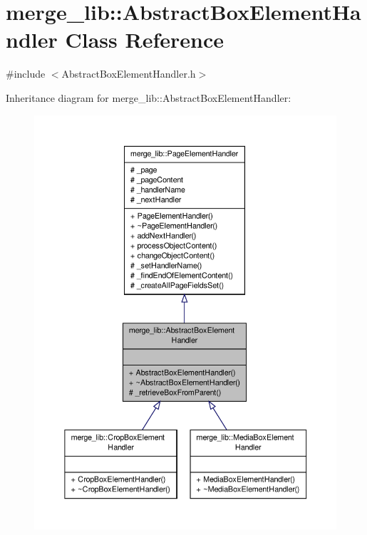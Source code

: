 \hypertarget{classmerge__lib_1_1_abstract_box_element_handler}{\section{merge\-\_\-lib\-:\-:Abstract\-Box\-Element\-Handler Class Reference}
\label{de/dd6/classmerge__lib_1_1_abstract_box_element_handler}
}


{\ttfamily \#include $<$Abstract\-Box\-Element\-Handler.\-h$>$}



Inheritance diagram for merge\-\_\-lib\-:\-:Abstract\-Box\-Element\-Handler\-:
\nopagebreak
\begin{figure}[H]
\begin{center}
\leavevmode
\includegraphics[width=350pt]{d9/db8/classmerge__lib_1_1_abstract_box_element_handler__inherit__graph}
\end{center}
\end{figure}


